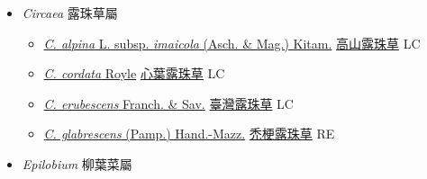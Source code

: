 
  \begin{itemize}
 \item[] \textit{Circaea} 露珠草屬
                    
  \begin{itemize}
        \item[] \href{http://www.theplantlist.org/tpl1.1/search?q=Circaea+alpina+subsp.+imaicola}{\textit{C. alpina} L. subsp. \textit{imaicola} (Asch. \& Mag.) Kitam.}   \href{\detokenize{http://taibnet.sinica.edu.tw/chi/taibnet_species_list.php?T2=高山露珠草&T2_new_value=true&fr=y}}{高山露珠草} LC
        \item[] \href{http://www.theplantlist.org/tpl1.1/search?q=Circaea+cordata}{\textit{C. cordata} Royle}   \href{\detokenize{http://taibnet.sinica.edu.tw/chi/taibnet_species_list.php?T2=心葉露珠草&T2_new_value=true&fr=y}}{心葉露珠草} LC
        \item[] \href{http://www.theplantlist.org/tpl1.1/search?q=Circaea+erubescens}{\textit{C. erubescens} Franch. \& Sav.}   \href{\detokenize{http://taibnet.sinica.edu.tw/chi/taibnet_species_list.php?T2=臺灣露珠草&T2_new_value=true&fr=y}}{臺灣露珠草} LC
        \item[] \href{http://www.theplantlist.org/tpl1.1/search?q=Circaea+glabrescens}{\textit{C. glabrescens} (Pamp.) Hand.-Mazz.}   \href{\detokenize{http://taibnet.sinica.edu.tw/chi/taibnet_species_list.php?T2=禿梗露珠草&T2_new_value=true&fr=y}}{禿梗露珠草} RE
  \end{itemize}
 \item[] \textit{Epilobium} 柳葉菜屬
                    

\end{itemize}
